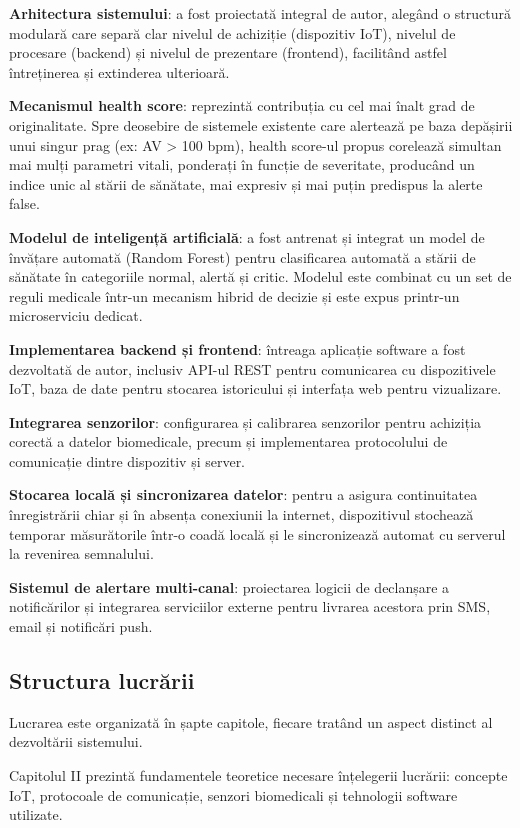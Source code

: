 \documentclass[12pt,a4paper,twoside]{article}
\begin{document}
\textbf{Arhitectura sistemului}: a fost proiectată integral de autor, alegând o structură modulară care separă clar nivelul de achiziție (dispozitiv IoT), nivelul de procesare (backend) și nivelul de prezentare (frontend), facilitând astfel întreținerea și extinderea ulterioară.

\textbf{Mecanismul health score}: reprezintă contribuția cu cel mai înalt grad de originalitate. Spre deosebire de sistemele existente care alertează pe baza depășirii unui singur prag (ex: AV > 100 bpm), health score-ul propus corelează simultan mai mulți parametri vitali, ponderați în funcție de severitate, producând un indice unic al stării de sănătate, mai expresiv și mai puțin predispus la alerte false.

\textbf{Modelul de inteligență artificială}: a fost antrenat și integrat un model de învățare automată (Random Forest) pentru clasificarea automată a stării de sănătate în categoriile normal, alertă și critic. Modelul este combinat cu un set de reguli medicale într-un mecanism hibrid de decizie și este expus printr-un microserviciu dedicat.

\textbf{Implementarea backend și frontend}: întreaga aplicație software a fost dezvoltată de autor, inclusiv API-ul REST pentru comunicarea cu dispozitivele IoT, baza de date pentru stocarea istoricului și interfața web pentru vizualizare.

\textbf{Integrarea senzorilor}: configurarea și calibrarea senzorilor pentru achiziția corectă a datelor biomedicale, precum și implementarea protocolului de comunicație dintre dispozitiv și server.

\textbf{Stocarea locală și sincronizarea datelor}: pentru a asigura continuitatea înregistrării chiar și în absența conexiunii la internet, dispozitivul stochează temporar măsurătorile într-o coadă locală și le sincronizează automat cu serverul la revenirea semnalului.

\textbf{Sistemul de alertare multi-canal}: proiectarea logicii de declanșare a notificărilor și integrarea serviciilor externe pentru livrarea acestora prin SMS, email și notificări push.

\subsection{Structura lucrării}

Lucrarea este organizată în șapte capitole, fiecare tratând un aspect distinct al dezvoltării sistemului.

Capitolul II prezintă fundamentele teoretice necesare înțelegerii lucrării: concepte IoT, protocoale de comunicație, senzori biomedicali și tehnologii software utilizate.
\end{document}
